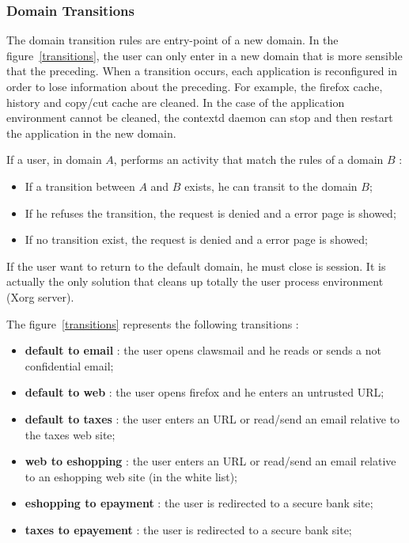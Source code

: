 \documentclass[conference]{IEEEtran}
\begin{document}
		\subsubsection{Domain Transitions}

The domain transition rules are entry-point of a new domain. 
In the figure~\ref{transitions}, the user can only enter in a new domain that is more sensible that the preceding.
When a transition occurs, each application is reconfigured in order to lose information about the preceding.
For example, the firefox cache, history and copy/cut cache are cleaned.
In the case of the application environment cannot be cleaned, the contextd daemon can stop and then restart the application in the new domain.

If a user, in domain $A$, performs an activity that match the rules of a domain $B$ :
\begin{itemize}
\item If a transition between $A$ and $B$ exists, he can transit to the domain $B$;
\item If he refuses the transition, the request is denied and a error page is showed;
\item If no transition exist, the request is denied and a error page is showed;
\end{itemize}

If the user want to return to the default domain, he must close is session. It is actually the only solution that cleans up totally the user process environment (Xorg server).

The figure~\ref{transitions} represents the following transitions :
\begin{itemize}
\item \textbf{default to email} : the user opens clawsmail and he reads or sends a not confidential email;
\item \textbf{default to web} : the user opens firefox and he enters an untrusted URL;
\item \textbf{default to taxes} : the user enters an URL or read/send an email relative to the taxes web site;
\item \textbf{web to eshopping} : the user enters an URL or read/send an email relative to an eshopping web site (in the white list);
\item \textbf{eshopping to epayment} : the user is redirected to a secure bank site;
\item \textbf{taxes to epayement} : the user is redirected to a secure bank site;
\end{itemize}
\end{document}
